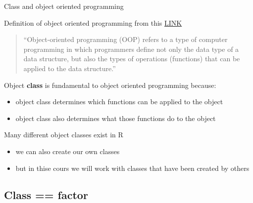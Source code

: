 \documentclass[8pt,ignorenonframetext,dvipsnames]{beamer}
\providecommand{\tightlist}{%
  \setlength{\itemsep}{0pt}\setlength{\parskip}{0pt}}
\renewcommand{\textbf}[1]{{\color{darkgray}\bfseries\fontfamily{Montserrat-TOsF}#1}}
\let\olditem\item
\renewcommand{\item}{%
  \olditem\vspace{4pt}
}
\begin{document}
\begin{frame}{Class and object oriented programming}

Definition of object oriented programming from this
\href{https://www.webopedia.com/TERM/O/object_oriented_programming_OOP.html}{LINK}

\begin{quote}
``Object-oriented programming (OOP) refers to a type of computer
programming in which programmers define not only the data type of a data
structure, but also the types of operations (functions) that can be
applied to the data structure.''
\end{quote}

Object \textbf{class} is fundamental to object oriented programming
because:

\begin{itemize}
\tightlist
\item
  object class determines which functions can be applied to the object
\item
  object class also determines what those functions do to the object
\end{itemize}

Many different object classes exist in R

\begin{itemize}
\tightlist
\item
  we can also create our own classes
\item
  but in thise cours we will work with classes that have been created by
  others
\end{itemize}

\end{frame}

\subsection{Class == factor}\label{class-factor}
\end{document}
